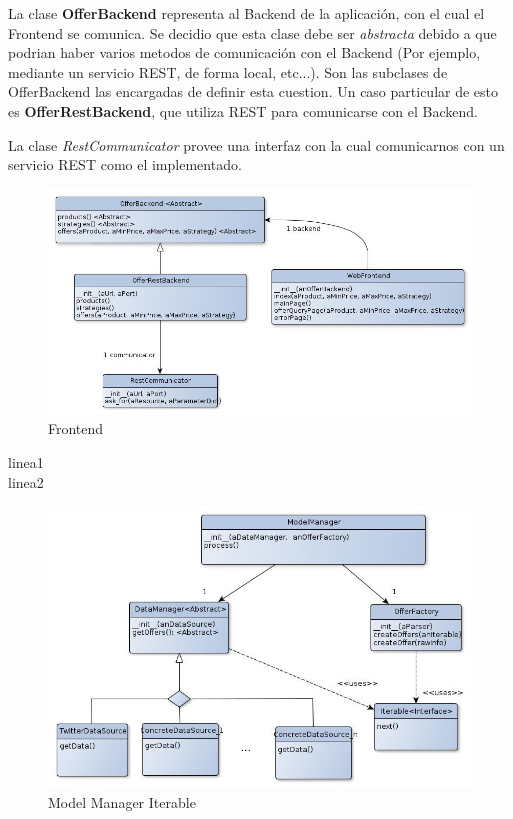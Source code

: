 \documentclass[10pt, a4paper]{article}
\begin{document}
La clase \textbf{OfferBackend} representa al Backend de la aplicación, con el cual el Frontend se comunica. Se decidio que esta clase debe ser \emph{abstracta} debido a que podrian haber varios metodos de comunicación con el Backend (Por ejemplo, mediante un servicio REST, de forma local, etc...). Son las subclases de OfferBackend las encargadas de definir esta cuestion. Un caso particular de esto es \textbf{OfferRestBackend}, que utiliza REST para comunicarse con el Backend. 

La clase \emph{RestCommunicator} provee una interfaz con la cual comunicarnos con un servicio REST como el implementado. 

\begin{figure}[H]
\centering
\includegraphics[scale=0.6]{graphics/frontend_class.jpg}
\caption{Frontend}
\end{figure}
\newpage


linea1\\
linea2\\
\begin{figure}[H]
\centering
\includegraphics[scale=0.55]{graphics/model_manager_iterable_class.jpg}
\caption{Model Manager Iterable}
\end{figure}
\end{document}
